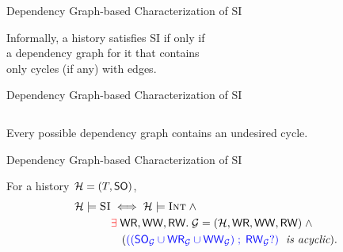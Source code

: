 \begin{frame}{Dependency Graph-based Characterization of SI}
  \begin{theorem}
		Informally, a history satisfies SI if only if \\[3pt]
		 a dependency graph for it that contains \\[3pt]
		only cycles (if any) with  edges.
	\end{theorem}
\end{frame}

\begin{frame}{Dependency Graph-based Characterization of SI}
	\begin{columns}
			{}
			{}
	\end{columns}

	\vspace{0.30cm}
	\begin{center}
		Every possible dependency graph contains
		an undesired  cycle.
	\end{center}
\end{frame}

\begin{frame}{Dependency Graph-based Characterization of SI}
  \begin{theorem}
		For a history \emph{$\mathcal{H} = (T, \textup{\textsf{SO}})$},
		\vspace{-0.30cm}
		\begin{align*}
			\mathcal{H} \models \textsc{SI} & \iff \mathcal{H} \models \textsc{Int} \;\land \\
				&\textcolor{red}{\exists}\; \textup{\textsf{WR}}, \textup{\textsf{WW}}, \textup{\textsf{RW}}.\; \mathcal{G} = (\mathcal{H}, \textup{\textsf{WR}}, \textup{\textsf{WW}}, \textup{\textsf{RW}}) \;\land \\
				&\quad (\textcolor{blue}{((\textup{\textsf{SO}}_{\mathcal{G}} \cup \textup{\textsf{WR}}_{\mathcal{G}} \cup \textup{\textsf{WW}}_{\mathcal{G}}) \;;\; \textup{\textsf{RW}}_{\mathcal{G}}?)} \text{\it\; is acyclic}).
		\end{align*}
  \end{theorem}

	\begin{center}
		\resizebox{0.60\textwidth}{!}{}
	\end{center}
\end{frame}

